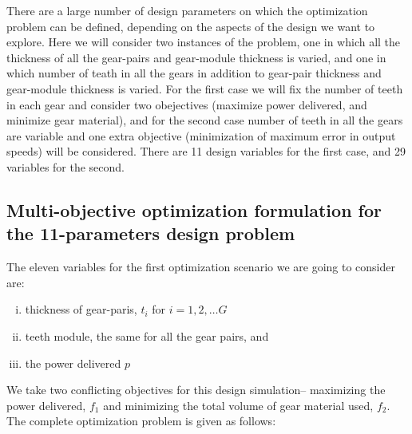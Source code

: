 There are a large number of design parameters on which the optimization
problem can be defined, depending on the aspects of the design we want to
explore. Here we will consider two instances of the problem, one in which
all the thickness of all the gear-pairs and gear-module thickness is
varied, and one in which number of teath in all the gears in addition to
gear-pair thickness and gear-module thickness is varied. For the first case
we will fix the number of teeth in each gear and consider two obejectives
(maximize power delivered, and minimize gear material), and for the second
case number of teeth in all the gears are variable and one extra objective
(minimization of maximum error in output speeds) will be considered.  There
are 11 design variables for the first case, and 29 variables for the
second.

\subsection{Multi-objective optimization formulation for the 
11-parameters design problem}

The eleven variables for the first optimization scenario we are going 
to consider are:

\begin{enumerate}[(i)]
\item thickness of gear-paris, $t_i$ for $i = 1, 2, \dots G$
\item teeth module, the same for all the gear pairs, and
\item the power delivered $p$
\end{enumerate}

We take two conflicting objectives for this design simulation-- 
maximizing the power delivered, $f_1$ and minimizing the total volume
of gear material used, $f_2$. The complete optimization problem is 
given as follows:


